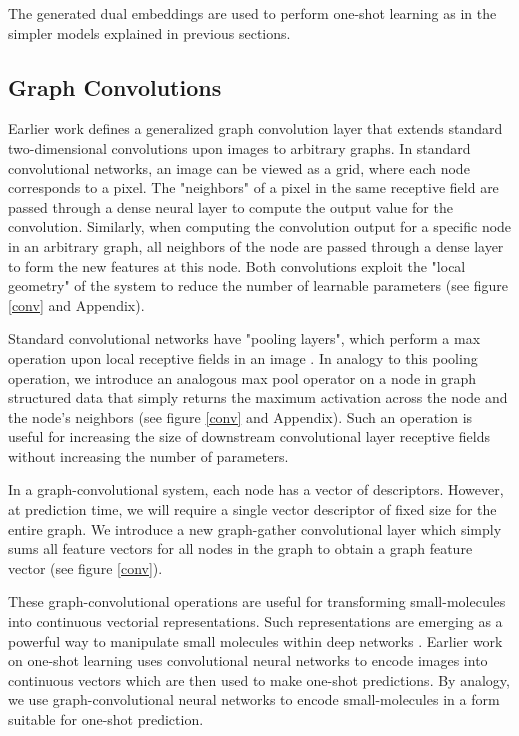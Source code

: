 \documentclass[journal=jacsat,manuscript=article]{achemso}
\begin{document}
The generated dual embeddings are used to perform one-shot learning as in the simpler models explained in previous sections.


\subsection{Graph Convolutions}
Earlier work \cite{duvenaud2015convolutional} defines a generalized graph convolution layer that extends standard two-dimensional convolutions upon images to arbitrary graphs. In standard convolutional networks, an image can be viewed as a grid, where each node corresponds to a pixel. The "neighbors" of a pixel in the same receptive field are passed through a dense neural layer to compute the output value for the convolution\cite{karpathy231n}. Similarly, when computing the convolution output for a specific node in an arbitrary graph, all neighbors of the node are passed through a dense layer to form the new features at this node. Both convolutions exploit the "local geometry" of the system to reduce the number of learnable parameters (see figure \ref{conv} and Appendix).

Standard convolutional networks have "pooling layers", which perform a max operation upon local receptive fields in an image \cite{karpathy231n}. In analogy to this pooling operation, we introduce an analogous max pool operator on a node in graph structured data that simply returns the maximum activation across the node and the node's neighbors (see figure \ref{conv} and Appendix). Such an operation is useful for increasing the size of downstream convolutional layer receptive fields without increasing the number of parameters.

In a graph-convolutional system, each node has a vector of descriptors. However, at prediction time, we will require a single vector descriptor of fixed size for the entire graph. We introduce a new graph-gather convolutional layer which simply sums all feature vectors for all nodes in the graph to obtain a graph feature vector (see figure \ref{conv}).

These graph-convolutional operations are useful for transforming small-molecules into continuous vectorial representations. Such representations are emerging as a powerful way to manipulate small molecules within deep networks \cite{gomez2016automatic}. Earlier work on one-shot learning uses convolutional neural networks to encode images into continuous vectors which are then used to make one-shot predictions. By analogy, we use graph-convolutional neural networks to encode small-molecules in a form suitable for one-shot prediction.
\end{document}
